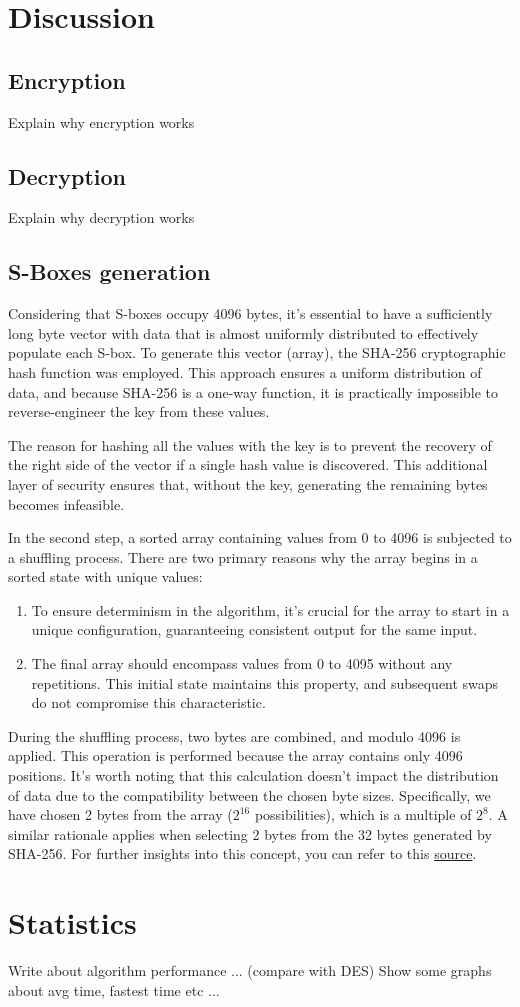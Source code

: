 \documentclass{article} %
\begin{document}
\section {Discussion}

\subsection{Encryption}
Explain why encryption works

\subsection{Decryption}
Explain why decryption works

\subsection{S-Boxes generation}

Considering that S-boxes occupy 4096 bytes, it's essential to have a sufficiently long byte vector with data that is almost uniformly distributed to effectively populate each S-box. To generate this vector (array), the SHA-256 cryptographic hash function was employed. This approach ensures a uniform distribution of data, and because SHA-256 is a one-way function, it is practically impossible to reverse-engineer the key from these values.

The reason for hashing all the values with the key is to prevent the recovery of the right side of the vector if a single hash value is discovered. This additional layer of security ensures that, without the key, generating the remaining bytes becomes infeasible.

In the second step, a sorted array containing values from 0 to 4096 is subjected to a shuffling process. There are two primary reasons why the array begins in a sorted state with unique values:

\begin{enumerate}
\item To ensure determinism in the algorithm, it's crucial for the array to start in a unique configuration, guaranteeing consistent output for the same input.
\item The final array should encompass values from 0 to 4095 without any repetitions. This initial state maintains this property, and subsequent swaps do not compromise this characteristic.
\end{enumerate}

During the shuffling process, two bytes are combined, and modulo 4096 is applied. This operation is performed because the array contains only 4096 positions. It's worth noting that this calculation doesn't impact the distribution of data due to the compatibility between the chosen byte sizes. Specifically, we have chosen 2 bytes from the array ($2^{16}$ possibilities), which is a multiple of $2^8$. A similar rationale applies when selecting 2 bytes from the 32 bytes generated by SHA-256. For further insights into this concept, you can refer to this \href{https://crypto.stackexchange.com/a/21010}{source}.

\section{Statistics}
Write about algorithm performance ... (compare with DES)
Show some graphs about avg time, fastest time etc ...
\end{document}
